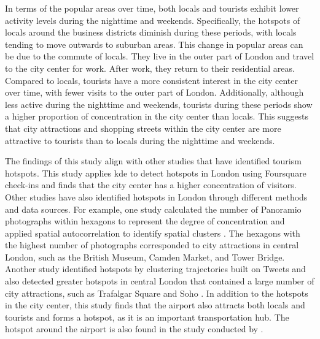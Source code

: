 \documentclass{article}
\theoremstyle{remark}
\begin{document}
In terms of the popular areas over time, both locals and tourists exhibit lower activity levels during the nighttime and weekends. Specifically, the hotspots of locals around the business districts diminish during these periods, with locals tending to move outwards to suburban areas. This change in popular areas can be due to the commute of locals. They live in the outer part of London and travel to the city center for work. After work, they return to their residential areas. Compared to locals, tourists have a more consistent interest in the city center over time, with fewer visits to the outer part of London. Additionally, although less active during the nighttime and weekends, tourists during these periods show a higher proportion of concentration in the city center than locals. This suggests that city attractions and shopping streets within the city center are more attractive to tourists than to locals during the nighttime and weekends.

The findings of this study align with other studies that have identified tourism hotspots. This study applies \acrshort{kde} to detect hotspots in London using Foursquare check-ins and finds that the city center has a higher concentration of visitors. Other studies have also identified hotspots in London through different methods and data sources. For example, one study calculated the number of Panoramio photographs within hexagons to represent the degree of concentration and applied spatial autocorrelation to identify spatial clusters \citep{garcia-palomares_identification_2015}. The hexagons with the highest number of photographs corresponded to city attractions in central London, such as the British Museum, Camden Market, and Tower Bridge. Another study identified hotspots by clustering trajectories built on Tweets and also detected greater hotspots in central London that contained a large number of city attractions, such as Trafalgar Square and Soho  \citep{ma_exploring_2020}. In addition to the hotspots in the city center, this study finds that the airport also attracts both locals and tourists and forms a hotspot, as it is an important transportation hub. The hotspot around the airport is also found in the study conducted by \cite{su_analysing_2020}.
\end{document}
